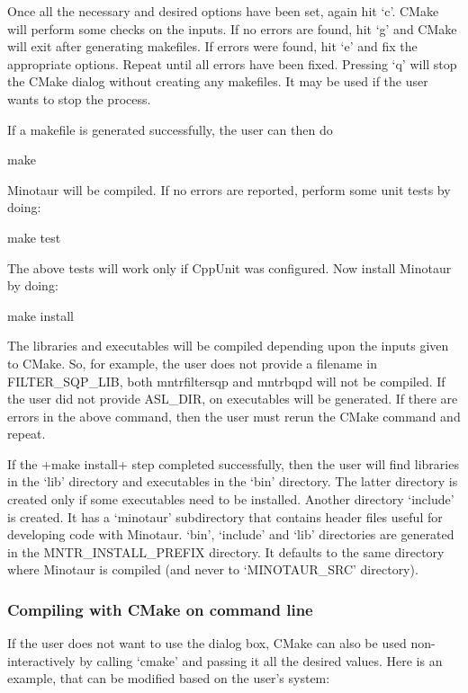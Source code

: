 Once all the necessary and desired options have been set, again hit `c'. CMake
will perform some checks on the inputs. If no errors are found, hit `g' and
CMake will exit after generating makefiles. If errors were found, hit `e' and
fix the appropriate options. Repeat until all errors have been fixed. Pressing
`q' will stop the CMake dialog without creating any makefiles. It may be used
if the user wants to stop the process.

If a makefile is generated successfully, the user can then do 
\begin{codeenv}
make 
\end{codeenv}
Minotaur will be compiled. If no errors are reported, perform some unit tests
by doing:
\begin{codeenv}
make test
\end{codeenv}
The above tests will work only if CppUnit was configured. Now install Minotaur
by doing:
\begin{codeenv}
make install
\end{codeenv}
The libraries and executables will be
compiled depending upon the inputs given to CMake. So, for example, the user
does not provide a filename in FILTER\_SQP\_LIB, both mntrfiltersqp and
mntrbqpd will not be compiled. If the user did not provide ASL\_DIR, on
executables will be generated. If there are errors in the above command, then
the user must rerun the CMake command and repeat.

If the \code+make install+ step completed successfully, then the user will
find libraries in the `lib' directory and executables in the `bin' directory.
The latter directory is created only if some executables need to be installed.
Another directory `include' is created. It has a `minotaur' subdirectory that
contains header files useful for developing code with Minotaur.
`bin', `include' and `lib' directories are generated in the
MNTR\_INSTALL\_PREFIX directory. It defaults to the same directory
where Minotaur is compiled (and never to `MINOTAUR\_SRC' directory).

\subsubsection{Compiling with CMake on command line}
If the user does not want to use the dialog box, CMake can also be used
non-interactively by calling `cmake' and passing it all the desired values.
Here is an example, that can be modified based on the user's system:

